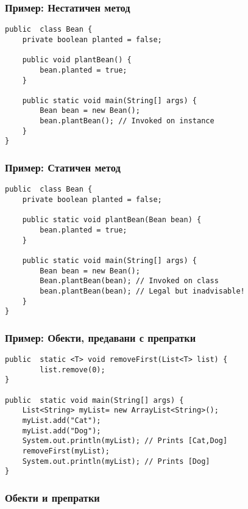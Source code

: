 \documentclass[ignorenonframetext, hyperref=unicode,compress]{beamer}
\begin{document}
\begin{frame}[containsverbatim]\frametitle{Пример: Нестатичен метод}
\begin{lstlisting}
public  class Bean {
 	private boolean planted = false;

 	public void plantBean() {
 		bean.planted = true;
	}

 	public static void main(String[] args) {
 		Bean bean = new Bean();
 		bean.plantBean(); // Invoked on instance
	}
}
\end{lstlisting}
\end{frame}

\begin{frame}[containsverbatim]\frametitle{Пример: Статичен метод}
\begin{lstlisting}
public  class Bean {
 	private boolean planted = false;

 	public static void plantBean(Bean bean) {
 		bean.planted = true;
	}

 	public static void main(String[] args) {
 		Bean bean = new Bean();
 		Bean.plantBean(bean); // Invoked on class
 		bean.plantBean(bean); // Legal but inadvisable!
	}
}
\end{lstlisting}
\end{frame}

\begin{frame}[containsverbatim]\frametitle{Пример: Обекти, предавани с препратки}
\begin{lstlisting}
public  static <T> void removeFirst(List<T> list) {
		list.remove(0);
}

public  static void main(String[] args) {
 	List<String> myList= new ArrayList<String>();
	myList.add("Cat"); 
	myList.add("Dog");
 	System.out.println(myList); // Prints [Cat,Dog]
	removeFirst(myList);
 	System.out.println(myList); // Prints [Dog]
}
\end{lstlisting}
\end{frame}

\begin{frame}[containsverbatim]\frametitle{Обекти и препратки}

\begin{center}
\end{center}

\end{frame}
\end{document}
